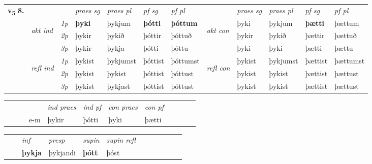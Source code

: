 \begin{tabular}{llllllllllll} \toprule
\multirow{4}{*}{{{\textbf{v{\textsubscript{5}}} \Large{\textbf{8.}}}}}  & &   &  \textit{praes sg}  & \textit{praes pl}  &\textit{ pf sg} & \textit{pf pl} &  &  \textit{praes sg}  & \textit{praes pl}  & \textit{pf sg} & \textit{pf pl } \\*
	\cmidrule{4-7} \cmidrule{9-12}
 & \multirow{3}{*}{\begin{turn}{90}\textit{akt ind}\end{turn}} & {\textit{1p}} & \textbf{þyki} & þykjum    & \textbf{þótti} & \textbf{þóttum} & \multirow{3}{*}{\begin{turn}{90}\textit{akt con}\end{turn}} &þyki & þykjum & \textbf{þætti} & þættum\\*
& &  {\textit{2p}} &  þykir  & þykið   & þóttir & þóttuð & & þykir & þykið & þættir & þættuð \\*
& &  {\textit{3p}} & þykir & þykja   & þótti & þóttu & & þyki & þyki& þætti & þættu  \\*
\cmidrule{4-7} \cmidrule{9-12}
 &\multirow{3}{*}{\begin{turn}{90}\textit{refl ind}\end{turn}} & {\textit{1p}} & þykist & þykjumst    & þóttist & þóttumst & \multirow{3}{*}{\begin{turn}{90}\textit{refl con}\end{turn}}  &þykist & þykjumst & þættist & þættumst\\*
 &&  {\textit{2p}} &  þykist  & þykist   & þóttist & þóttust & &þykist & þykist & þættist & þættust \\*
& &  {\textit{3p}} & þykist & þykjast   & þóttist & þóttust & & þykist & þykist& þættist & þættust  \\*
\cmidrule{4-7} \cmidrule{9-12}
\end{tabular}


\begin{tabular}{llllllllllll}
 & &  & &  \textit{ind praes} & \textit{ind pf} & \textit{con praes} & \textit{con pf} \\*
&  & & e-m & þykir & þótti & þyki & þætti \\*
\cmidrule{5-9}
\end{tabular}


\begin{tabular}{llllllllllll}
 & & \textit{inf}     & \textit{presp} & \textit{supin} & \textit{supin refl}      \\*
  & & \textbf{þykja}      & þykjandi &  \textbf{þótt} & þóst  \\*
\cmidrule{1-12}
\end{tabular}



